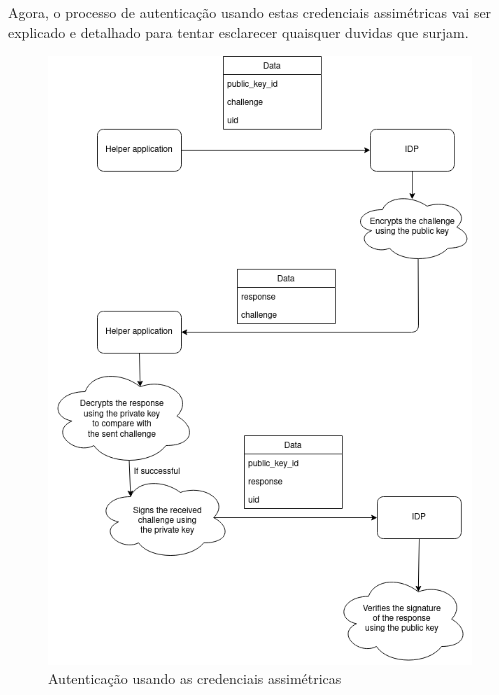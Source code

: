 \quad Agora, o processo de autenticação usando estas credenciais assimétricas vai ser explicado e detalhado para tentar esclarecer quaisquer duvidas que surjam.


\begin{figure}[H]
    \caption{Autenticação usando as credenciais assimétricas}
    \includegraphics[width=\textwidth]{img/pub_key_auth.png}
    \centering
\end{figure}

